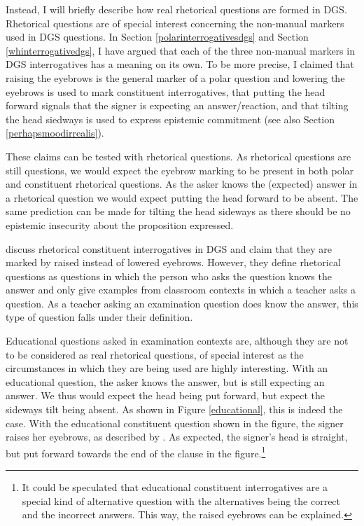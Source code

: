 \noindent Instead, I will briefly describe how real rhetorical questions are formed in DGS. Rhetorical questions are of special interest concerning the non-manual markers used in DGS questions. In Section \ref{polarinterrogativesdgs} and Section \ref{whinterrogativedgs}, I have argued that each of the three non-manual markers in DGS interrogatives has a meaning on its own. To be more precise, I claimed that raising the eyebrows is the general marker of a polar question and lowering the eyebrows is used to mark constituent interrogatives, that putting the head forward signals that the signer is expecting an answer/reaction, and that tilting the head siedways is used to express epistemic commitment (see also Section \ref{perhapsmoodirrealis}). 

These claims can be tested with rhetorical questions. As rhetorical questions are still questions, we would expect the eyebrow marking to be present in both polar and constituent rhetorical questions. As the asker knows the (expected) answer in a rhetorical question we would expect putting the head forward to be absent. The same prediction can be made for tilting the head sideways as there should be no epistemic insecurity about the proposition expressed. 

\citet[333]{happ2014vork} discuss rhetorical constituent interrogatives in DGS and claim that they are marked by raised instead of lowered eyebrows. However, they define rhetorical questions as questions in which the person who asks the question knows the answer and only give examples from classroom contexts in which a teacher asks a question. As a teacher asking an examination question does know the answer, this type of question falls under their definition.

Educational questions asked in examination contexts are, although they are not to be considered as real rhetorical questions, of special interest as the circumstances in which they are being used are highly interesting. With an educational question, the asker knows the answer, but is still expecting an answer. We thus would expect the head being put forward, but expect the sideways tilt being absent. As shown in Figure \ref{educational}, this is indeed the case. With the educational constituent question shown in the figure, the signer raises her eyebrows, as described by \citet{happ2014vork}. As expected, the signer's head is straight, but put forward towards the end of the clause in the figure.\footnote{It could be speculated that educational constituent interrogatives are a special kind of alternative question with the alternatives being the correct and the incorrect answers. This way, the raised eyebrows can be explained.}


